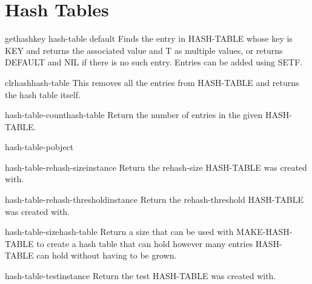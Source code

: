 \chapter{Hash Tables}

\begin{accessor}{gethash}{key hash-table \op default}{}{}
  Finds the entry in HASH-TABLE whose key is KEY and returns the
associated value and T as multiple values, or returns DEFAULT and NIL
if there is no such entry. Entries can be added using SETF.
\end{accessor}

\begin{function}{clrhash}{hash-table}{}{}
  This removes all the entries from HASH-TABLE and returns the hash
table itself.
\end{function}

\begin{function}{hash-table-count}{hash-table}{}{}
  Return the number of entries in the given HASH-TABLE.
\end{function}

\begin{function}{hash-table-p}{object}{}{}
  
\end{function}

\begin{function}{hash-table-rehash-size}{instance}{}{}
  Return the rehash-size HASH-TABLE was created with.
\end{function}

\begin{function}{hash-table-rehash-threshold}{instance}{}{}
  Return the rehash-threshold HASH-TABLE was created with.
\end{function}

\begin{function}{hash-table-size}{hash-table}{}{}
  Return a size that can be used with MAKE-HASH-TABLE to create a hash
   table that can hold however many entries HASH-TABLE can hold without
   having to be grown.
\end{function}

\begin{function}{hash-table-test}{instance}{}{}
  Return the test HASH-TABLE was created with.
\end{function}

